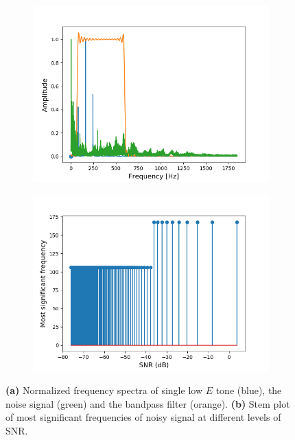 \begin{figure}[H]
\begin{subfigure}{0.49\textwidth}
\centering
\includegraphics[width=\textwidth]{figures/SNR/single_spectrum.png}
\caption{}
\label{fig:single_spectrum}
\end{subfigure}
\begin{subfigure}{0.49\textwidth}
\centering
\includegraphics[width=\textwidth]{figures/SNR/single_stem.png}
\caption{}
\label{fig:single_stem}
\end{subfigure}
\caption{\textbf{(a)} Normalized frequency spectra of single low $E$ tone (blue), the noise signal (green) and the bandpass filter (orange). \textbf{(b)} Stem plot of most significant frequencies of noisy signal at different levels of SNR.}
\label{fig:single_noise}
\end{figure}

